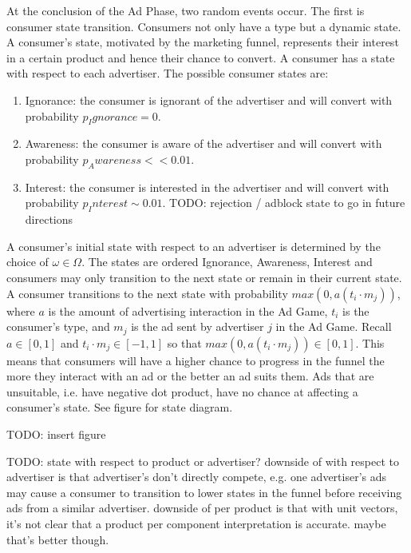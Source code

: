 \documentclass{article}
\begin{document}
At the conclusion of the Ad Phase, two random events occur. The first is consumer state transition. Consumers not only have a type but a dynamic state. A consumer's state, motivated by the marketing funnel, represents their interest in a certain product and hence their chance to convert. A consumer has a state with respect to each advertiser. The possible consumer states are:

\begin{enumerate}
	\item Ignorance: the consumer is ignorant of the advertiser and will convert with probability $p_Ignorance = 0$.
	\item Awareness: the consumer is aware of the advertiser and will convert with probability $p_Awareness << 0.01$.
	\item Interest: the consumer is interested in the advertiser and will convert with probability $p_Interest \sim 0.01$.
TODO: rejection / adblock state to go in future directions
\end{enumerate}

A consumer's initial state with respect to an advertiser is determined by the choice of $\omega \in \Omega$. The states are ordered Ignorance, Awareness, Interest and consumers may only transition to the next state or remain in their current state. A consumer transitions to the next state with probability $max(0, a (t_i \cdot m_j))$, where $a$ is the amount of advertising interaction in the Ad Game, $t_i$ is the consumer's type, and $m_j$ is the ad sent by advertiser $j$ in the Ad Game. Recall $a \in [0,1]$ and $t_i \cdot m_j \in [-1,1]$ so that $max(0, a (t_i \cdot m_j)) \in [0,1]$. This means that consumers will have a higher chance to progress in the funnel the more they interact with an ad or the better an ad suits them. Ads that are unsuitable, i.e. have negative dot product, have no chance at affecting a consumer's state. See figure for state diagram.

TODO: insert figure

TODO: state with respect to product or advertiser? downside of with respect to advertiser is that advertiser's don't directly compete, e.g. one advertiser's ads may cause a consumer to transition to lower states in the funnel before receiving ads from a similar advertiser. downside of per product is that with unit vectors, it's not clear that a product per component interpretation is accurate. maybe that's better though.
\end{document}
